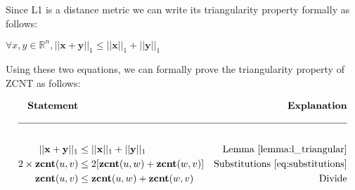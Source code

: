 Since L1 is a distance metric we can write its triangularity property formally as follows: 

\begin{lemma}\label{lemma:l_triangular}
    $\forall x, y \in \mathbb{R}^n, ||\mathbf x + \mathbf y||_1 \leq ||\mathbf x||_1 + ||\mathbf y||_1$
\end{lemma}

Using these two equations, we can formally prove the triangularity property of ZCNT as follows: 

\begin{align*}
    \textbf{Statement} & & \textbf{Explanation} \\
    \cline{1-3} \\
    ||\mathbf x + \mathbf y||_1 & \leq ||\mathbf x||_1 + ||\mathbf y||_1 & \text{Lemma}~\ref{lemma:l_triangular} \\ 
    2 \times \zcnt(u, v) & \leq 2[\zcnt(u, w) + \zcnt(w, v)] & \text{Substitutions~\ref{eq:substitutions}} \\ 
    \zcnt(u, v) &\leq \zcnt(u, w) + \zcnt(w, v) & \text{Divide}
\end{align*}